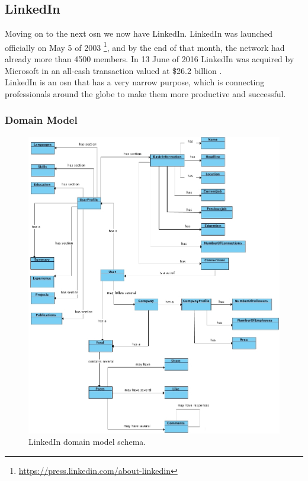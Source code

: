 \subsection{LinkedIn}

Moving on to the next \gls{osn} we now have LinkedIn. LinkedIn was launched officially on May 5 of 2003 \footnote{\url{https://press.linkedin.com/about-linkedin}}, and by the end of
that month, the network had already more than 4500 members. In 13 June of 2016 LinkedIn was acquired by Microsoft in an all-cash transaction valued at \$26.2
billion \citep{microlink}.\\
\indent LinkedIn is an \gls{osn} that has a very narrow purpose, which is
connecting professionals around the globe to make them more productive and successful.

\subsubsection*{Domain Model}

\begin{figure}[h!]
  \hspace*{-0.5in}
  \includegraphics[width=1.10\textwidth]{img/linkedin-domain-model.jpg}
\caption{\label{img:linkdomain} LinkedIn domain model schema.}
\end{figure}

